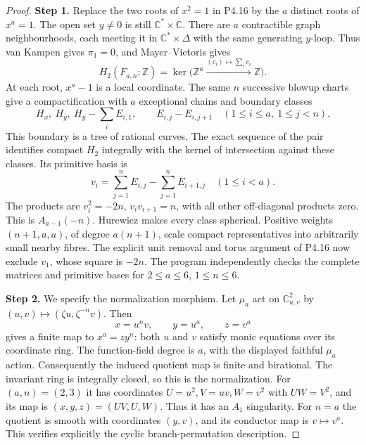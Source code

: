 \begin{proof}
\noindent\textbf{Step 1.} Replace the two roots of $x^2=1$ in P4.16 by the $a$ distinct
roots of $x^a=1$. The open set $y\ne0$ is still
$\mathbb C^*\times\mathbb C$. There are $a$ contractible graph
neighbourhoods, each meeting it in $\mathbb C^*\times\Delta$
with the same generating $y$-loop. Thus van Kampen gives
$\pi_1=0$, and Mayer--Vietoris gives
\[
 H_2(F_{a,n};\mathbb Z)=\ker\bigl(\mathbb Z^a
   \xrightarrow{(c_i)\mapsto\sum_i c_i}\mathbb Z\bigr).
\]
At each root, $x^a-1$ is a local coordinate. The same $n$
successive blowup charts give a compactification with $a$
exceptional chains and boundary classes
\[
 H_x,\ H_y,\ H_y-\sum_i E_{i,1},\qquad
 E_{i,j}-E_{i,j+1}\quad(1\leq i\leq a,\ 1\leq j<n).
\]
This boundary is a tree of rational curves. The exact sequence
of the pair identifies compact $H_2$ integrally with the kernel
of intersection against these classes. Its primitive basis is
\[
 v_i=\sum_{j=1}^n E_{i,j}-\sum_{j=1}^n E_{i+1,j}
       \quad(1\leq i<a).
\]
The products are $v_i^2=-2n$, $v_iv_{i+1}=n$, with all other
off-diagonal products zero. This is $A_{a-1}(-n)$.
Hurewicz makes every class spherical. Positive weights
$(n+1,a,a)$, of degree $a(n+1)$, scale compact representatives
into arbitrarily small nearby fibres. The explicit unit removal
and torus argument of P4.16 now exclude $v_1$, whose square
is $-2n$. The program independently checks the complete
matrices and primitive bases for $2\leq a\leq6$, $1\leq n\leq6$.

\noindent\textbf{Step 2.} We specify the normalization morphism. Let $\mu_a$ act on
$\mathbb C^2_{u,v}$ by $(u,v)\mapsto(\zeta u,\zeta^{-n}v)$.
Then
\[
 x=u^nv,\qquad y=u^a,\qquad z=v^a
\]
gives a finite map to $x^a=zy^n$: both $u$ and $v$ satisfy
monic equations over its coordinate ring. The function-field
degree is $a$, with the displayed faithful $\mu_a$ action.
Consequently the induced quotient map is finite and birational.
The invariant ring is integrally closed, so this is the
normalization. For $(a,n)=(2,3)$ it has coordinates
$U=u^2,V=uv,W=v^2$ with $UW=V^2$, and its map is
$(x,y,z)=(UV,U,W)$. Thus it has an $A_1$ singularity.
For $n=a$ the quotient is smooth with coordinates $(y,v)$,
and its conductor map is $v\mapsto v^a$. This verifies
explicitly the cyclic branch-permutation description.
\end{proof}

